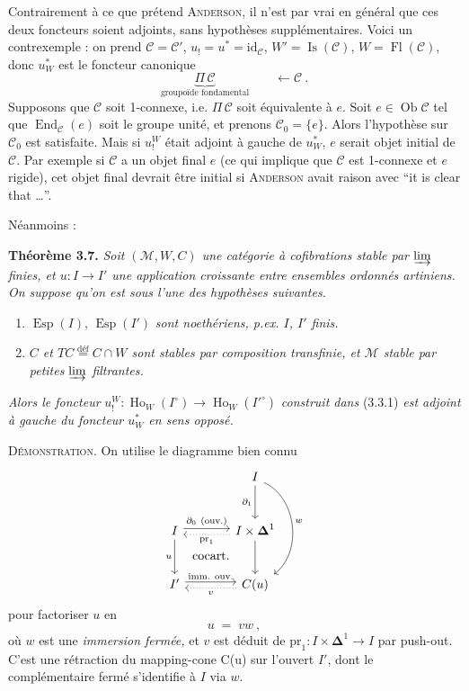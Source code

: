 \documentclass[11pt]{article}
\newcommand{\printedpage}[1]{\marginpar{\footnotesize p.~#1}}
\newcommand{\msp}[1]{\marginpar{\footnotesize [#1]}}
\newcommand{\Esp}{\operatorname{Esp}}
\newcommand{\Fl}{\operatorname{Fl}}
\newcommand{\Ob}{\operatorname{Ob}}
\newcommand{\Ho}{\operatorname{Ho}}
\newcommand{\id}{\mathrm{id}}
\newcommand{\pr}{\mathrm{pr}}
\newcommand{\M}{\mathcal{M}}
\begin{document}
\msp{page 59}
Contrairement à ce que prétend \textsc{Anderson}, il n'est par vrai en général que ces deux %
foncteurs soient adjoints, sans hypothèses supplémentaires. Voici un contrexemple : on prend $\mathcal{C} = \mathcal{C}'$, $u_! = u^* = \id_{\mathcal{C}}$, $W' = \operatorname{Is}(\mathcal{C})$, $W = \Fl(\mathcal{C})$, donc $u_W^*$ est le foncteur canonique
\[
\underbrace{\Pi\,\mathcal{C}}_{\text{groupoïde fondamental}} \qquad \longleftarrow \mathcal{C}\ .
\]
Supposons que $\mathcal{C}$ soit 1-connexe, i.e. $\Pi\,\mathcal{C}$ soit équivalente à $e$. Soit $e\in\Ob\mathcal{C}$ tel que $\operatorname{End}_{\mathcal{C}}(e)$ soit le groupe unité, et prenons $\mathcal{C}_0 = \{e\}$. Alors l'hypothèse sur $\mathcal{C}_0$ est satisfaite. Mais si $u_!^W$ était adjoint à gauche de $u_W^*$, $e$ serait objet initial de $\mathcal{C}$. Par exemple si $\mathcal{C}$ a un objet final $e$ (ce qui implique que $\mathcal{C}$ est 1-connexe et $e$ rigide), cet objet final devrait être initial si \textsc{Anderson} avait raison avec “it is clear that \ldots”.

\msp{page 60}
Néanmoins :

\textbf{Théorème 3.7.} \textit{Soit $(\M,W,C)$ une catégorie à cofibrations stable par $\varinjlim$ finies, et $u : I \longrightarrow I'$ une application croissante entre ensembles ordonnés artiniens. On suppose qu'on est sous l'une des hypothèses suivantes.}
\begin{enumerate}
\item[a)] $\Esp(I)$, $\Esp(I')$ \textit{sont noethériens, p.ex. $I$, $I'$ finis.}

\printedpage{30}
\item[b)] \textit{$C$ et $TC \overset{\text{déf}}{=} C\cap W$ sont stables par composition transfinie, et $\M$ stable par petites $\varinjlim$ filtrantes.}
\end{enumerate}
\textit{Alors le foncteur} $u_!^W : \Ho_W(I^\circ) \longrightarrow \Ho_W(I'^\circ)$ \textit{construit dans} (3.3.1) \textit{est adjoint à gauche du foncteur $u_W^*$ en sens opposé.}

\textsc{Démonstration.} On utilise le diagramme bien connu
\[
\begin{tikzcd}[row sep=large, column sep=large]
 & I \arrow[d, "\partial_1"'] \arrow[dd, bend left=60, "w"] \\
I \arrow[r, shift left, "\partial_0\ (\text{ouv.})"] \arrow[d, "u"'] \arrow[dr, phantom, "\text{cocart.}"] & I\times\boldsymbol{\Delta}^1 \arrow[l, dotted, shift left, "\pr_1"] \arrow[d] \\
I' \arrow[r, shift left, "\text{imm. ouv.}"] & C(u) \arrow[l, dotted, shift left, "v"]
\end{tikzcd}
\]
pour factoriser $u$ en
\[
u \;=\; vw\ ,
\]
où $w$ est une \textit{immersion fermée,} et $v$ est déduit de $\pr_1 : I\times\boldsymbol{\Delta}^1 \longrightarrow I$ par push-out. C'est une rétraction du mapping-cone C(u) sur l'ouvert $I'$, dont le complémentaire fermé s'identifie à $I$ via $w$.
\end{document}
